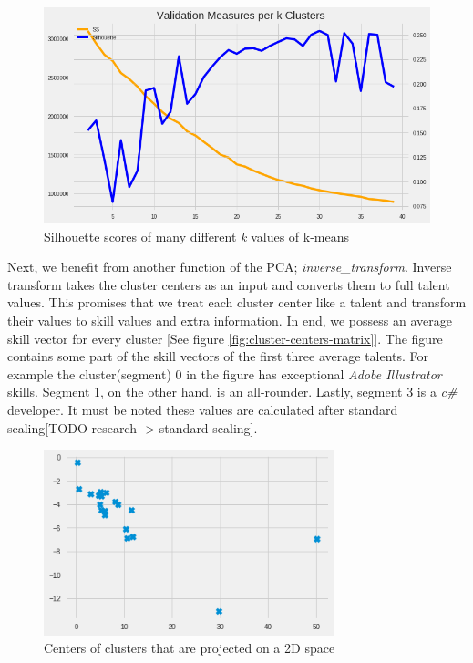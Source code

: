  \begin{figure}[!ht]
	\centering
	\includegraphics[width=\textwidth]{figures/PCASilhouette.png}
	\caption{Silhouette scores of many different \textit{k} values of k-means}
	\label{fig:pca-silhouette}
\end{figure}

Next, we benefit from another function of the PCA; \textit{inverse\_transform}. Inverse transform takes the cluster centers as an input and converts them to full talent values. This promises that we treat each cluster center like a talent and transform their values to skill values and extra information. In end, we possess an average skill vector for every cluster [See figure \ref{fig:cluster-centers-matrix}]. The figure contains some part of the skill vectors of the first three average talents. For example the cluster(segment) 0 in the figure has exceptional \textit{Adobe Illustrator} skills. Segment 1, on the other hand, is an all-rounder. Lastly, segment 3 is a \textit{c\#} developer.  It must be noted these values are calculated after standard scaling[TODO research -> standard scaling].

 \begin{figure}[!ht]
	\centering
	\includegraphics[width=0.75\textwidth]{figures/KMeansCenters.png}
	\caption{Centers of clusters that are projected on a 2D space}
	\label{fig:kmeans-centers}
\end{figure}



